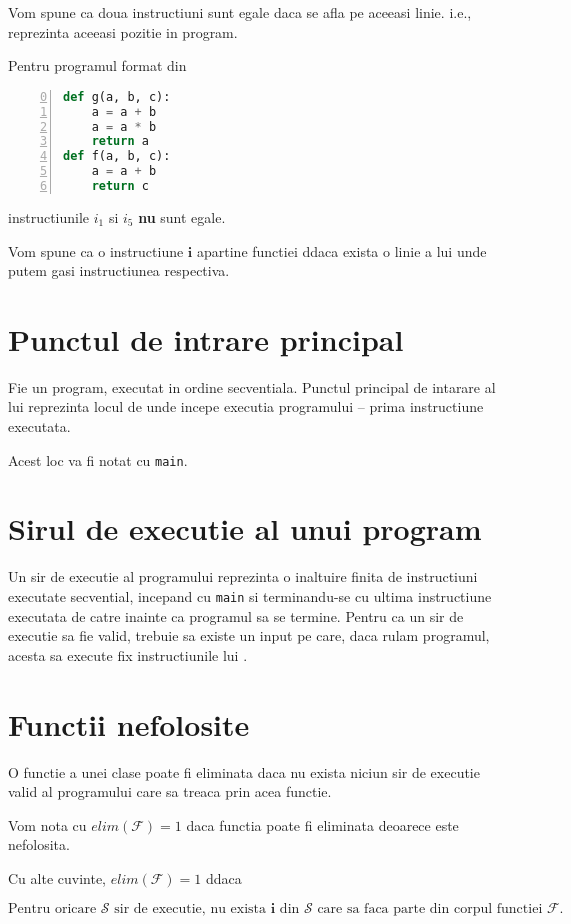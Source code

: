 Vom spune ca doua instructiuni sunt egale daca se afla pe aceeasi
linie. i.e., reprezinta aceeasi pozitie in program.

Pentru programul format din
\begin{lstlisting}[language=Python, numbers=left, firstnumber=0]
def g(a, b, c):
    a = a + b
    a = a * b
    return a
def f(a, b, c):
    a = a + b
    return c
\end{lstlisting}
instructiunile $i_1$ si $i_5$ \textbf{nu} sunt egale.

Vom spune ca o instructiune $\mathbf{i}$ apartine functiei
 ddaca exista o linie a lui  unde putem gasi
instructiunea respectiva.

\section{Punctul de intrare principal}

Fie  un program, executat in ordine secventiala.
Punctul principal de intarare al lui  reprezinta locul de
unde incepe executia programului -- prima instructiune executata.

Acest loc va fi notat cu \texttt{main}.

\section{Sirul de executie al unui program}

Un sir de executie  al programului  reprezinta o inaltuire
finita de instructiuni executate secvential, incepand cu
\texttt{main} si terminandu-se cu ultima instructiune executata de
catre  inainte ca programul sa se termine.
Pentru ca un sir de executie  sa fie valid, trebuie sa
existe un input pe care, daca rulam programul, acesta sa
execute fix instructiunile lui .

\section{Functii nefolosite}

O functie a unei clase poate fi eliminata daca nu exista niciun
sir de executie valid al programului care sa treaca prin acea
functie.

Vom nota cu $elim(\mathcal{F}) = 1$ daca functia  poate fi
eliminata deoarece este nefolosita.

Cu alte cuvinte, $elim(\mathcal{F}) = 1$ ddaca

\[
	\text{Pentru oricare } \mathcal{S} \text{ sir de executie, nu
		exista } \mathbf{i} \text{ din } \mathcal{S} \text { care sa faca
		parte din corpul functiei } \mathcal{F}.
\]

